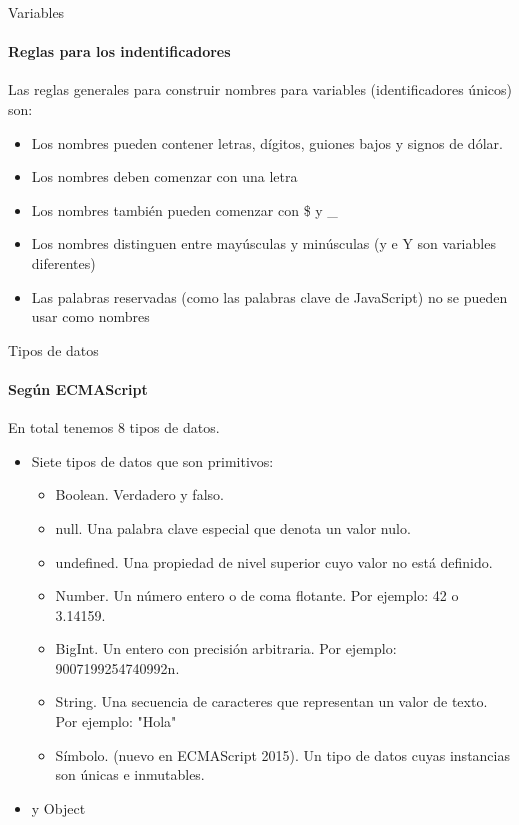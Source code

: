 \documentclass[aspectratio=169]{beamer}
\begin{document}
\begin{darkframes}
    \begin{frame}{Variables}
      \framesubtitle{Reglas para los indentificadores}
      Las reglas generales para construir nombres para variables (identificadores únicos) son:
      \begin{itemize}
        \item Los nombres pueden contener letras, dígitos, guiones bajos y signos de dólar.
        \item Los nombres deben comenzar con una letra
        \item Los nombres también pueden comenzar con \$ y \_
        \item Los nombres distinguen entre mayúsculas y minúsculas (y e Y son variables diferentes)
        \item Las palabras reservadas (como las palabras clave de JavaScript) no se pueden usar como nombres
      \end{itemize}
    \end{frame}

    \begin{frame}{Tipos de datos}
      \framesubtitle{Según ECMAScript}
      En total tenemos 8 tipos de datos.
      \begin{itemize}
        \item Siete tipos de datos que son primitivos:
        \begin{itemize}
          \item Boolean. Verdadero y falso.
          \item null. Una palabra clave especial que denota un valor nulo.
          \item undefined. Una propiedad de nivel superior cuyo valor no está definido.
          \item Number. Un número entero o de coma flotante. Por ejemplo: 42 o 3.14159.
          \item BigInt. Un entero con precisión arbitraria. Por ejemplo: 9007199254740992n.
          \item String. Una secuencia de caracteres que representan un valor de texto. Por ejemplo: "Hola"
          \item Símbolo. (nuevo en ECMAScript 2015). Un tipo de datos cuyas instancias son únicas e inmutables.
        \end{itemize}

        \item y Object
      \end{itemize}

    \end{frame}


\end{darkframes}
\end{document}
